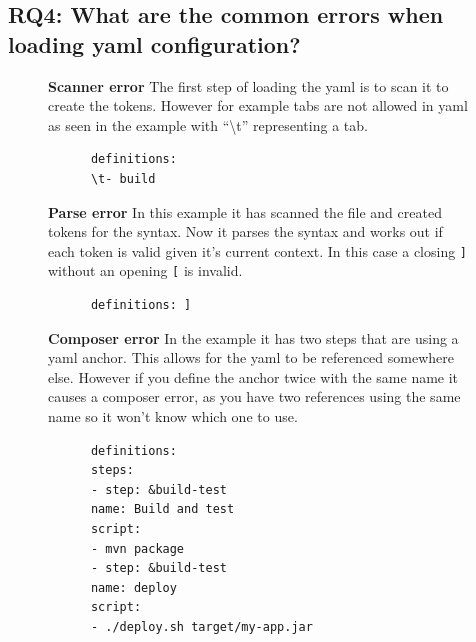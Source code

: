 \documentclass[10pt,conference]{IEEEtran}
\begin{document}
\subsection{\textbf{RQ4}: What are the common errors when loading yaml configuration?}
\label{section:RQ4}
\vspace*{-0.05in}
\begin{figure}[!h]
  \centering
  \begin{minipage}[t]{.48\textwidth}
    \textbf{Scanner error}
    The first step of loading the yaml is to scan it to create the tokens. However for example tabs are not allowed in yaml \citet{YAML_FAQ_TABS} as seen in the example with \enquote{\textbackslash t} representing a tab. 
  \end{minipage}%
  \hfill
  \begin{minipage}[t]{.48\textwidth}
    \begin{verbatim}
      definitions: 
      \t- build
    \end{verbatim}
  \end{minipage}
\end{figure}
\begin{figure}[!ht]
  \centering
  \begin{minipage}[t]{.48\textwidth}
    \textbf{Parse error}
    In this example it has scanned the file and created tokens for the syntax. Now it parses the syntax and works out if each token is valid given it's current context. In this case a closing \verb|]| without an opening \verb|[| is invalid.
  \end{minipage}%
  \hfill
  \begin{minipage}[t]{.48\textwidth}
    \begin{verbatim}
      definitions: ]
    \end{verbatim}
  \end{minipage}
\end{figure}

\begin{figure}[!ht]
  \centering
  \begin{minipage}[t]{.48\textwidth}
    \textbf{Composer error}
    In the example it has two steps that are using a yaml anchor. This allows for the yaml to be referenced somewhere else. However if you define the anchor twice with the same name it causes a composer error, as you have two references using the same name so it won't know which one to use.
  \end{minipage}%
  \hfill
  \begin{minipage}[t]{.48\textwidth}
    \begin{verbatim}
      definitions: 
      steps:
      - step: &build-test
      name: Build and test
      script:
      - mvn package
      - step: &build-test
      name: deploy
      script:
      - ./deploy.sh target/my-app.jar
    \end{verbatim}
  \end{minipage}
\end{figure}
\end{document}

